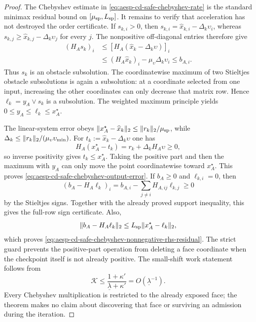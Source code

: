 \begin{proof}
The Chebyshev estimate in
\cref{eq:aesp-cd-safe-chebyshev-rate} is the standard minimax residual bound
on $[\mu_{\rm sp},L_{\rm sp}]$.  It remains to verify that acceleration has
not destroyed the order certificate.  If $s_{k,i}>0$, then
$s_{k,i}=\widehat x_{k,i}-\Delta_k\upsilon_i$, whereas
$s_{k,j}\geq\widehat x_{k,j}-\Delta_k\upsilon_j$ for every $j$.  The
nonpositive off-diagonal entries therefore give
\begin{align*}
 (H_As_k)_i
 &\leq[H_A(\widehat x_k-\Delta_k\upsilon)]_i\\
 &\leq(H_A\widehat x_k)_i-\mu_\upsilon\Delta_k\upsilon_i
 \leq b_{A,i}.
\end{align*}
Thus $s_k$ is an obstacle subsolution.  The coordinatewise maximum of two
Stieltjes obstacle subsolutions is again a subsolution: at a coordinate
selected from one input, increasing the other coordinates can only decrease
that matrix row.  Hence $\ell_k=y_A\vee s_k$ is a subsolution.  The weighted
maximum principle yields
$0\leq y_A\leq\ell_k\leq x_A^\star$.

The linear-system error obeys
$\lVert x_A^\star-\widehat x_k\rVert_2\leq
\lVert r_k\rVert_2/\mu_{\rm sp}$, while
$\Delta_k\leq
\lVert r_k\rVert_2/(\mu_\upsilon\upsilon_{\min})$.
For $t_k:=\widehat x_k-\Delta_k\upsilon$ one has
\begin{equation*}
 H_A(x_A^\star-t_k)=r_k+\Delta_kH_A\upsilon\geq0,
\end{equation*}
so inverse positivity gives $t_k\leq x_A^\star$.  Taking the positive part
and then the maximum with $y_A$ can only move the point coordinatewise toward
$x_A^\star$.  This proves
\cref{eq:aesp-cd-safe-chebyshev-output-error}.  If \(b_A\geq0\) and
\(\ell_{k,i}=0\), then
\begin{equation*}
 (b_A-H_A\ell_k)_i
 =b_{A,i}-\sum_{j\neq i}H_{A,ij}\ell_{k,j}\geq0
\end{equation*}
by the Stieltjes signs.  Together with the already proved support inequality,
this gives the full-row sign certificate.  Also,
\begin{equation*}
 \lVert b_A-H_A\ell_k\rVert_2
 \leq L_{\rm sp}\lVert x_A^\star-\ell_k\rVert_2,
\end{equation*}
which proves
\cref{eq:aesp-cd-safe-chebyshev-nonnegative-rhs-residual}.
The strict guard prevents the positive-part operation from deleting a face
coordinate when the checkpoint itself is not already positive.  The
small-shift work statement follows from
\begin{equation*}
 \mathcal K
 \leq\frac{1+\kappa'}{\underline\lambda+\kappa'}
 =O(\underline\lambda^{-1}).
\end{equation*}
Every Chebyshev multiplication is restricted to the already exposed face;
the theorem makes no claim about discovering that face or surviving an
admission during the iteration.
\end{proof}

